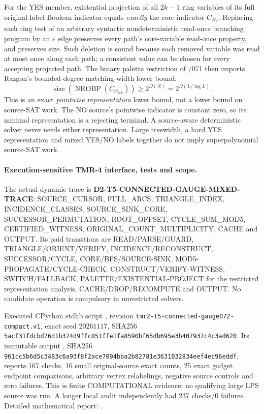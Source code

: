 \documentclass[11pt]{article}
\begin{document}
For the YES member, existential projection of all $2k-1$ ring variables of its full original-label Boolean indicator equals \emph{exactly} the core indicator $C_{H_q}$. Replacing each ring test of an arbitrary syntactic nondeterministic read-once branching program by an $\varepsilon$ edge preserves every path's core-variable read-once property, and preserves size. Such deletion is sound because each removed variable was read at most once along each path; a consistent value can be chosen for every accepting projected path. The binary palette restriction of /071 then imports Razgon's bounded-degree matching-width lower bound:
\[
 \operatorname{size}(\operatorname{NROBP}(C_{G_{5N}}))
 \ge 2^{\Omega(N)}=2^{\Omega(L/\log L)}.
\]
This is an exact \emph{pointwise representation} lower bound, not a lower bound on source-SAT work. The NO source's pointwise indicator is constant zero, so its minimal representation is a rejecting terminal. A source-aware deterministic solver never needs either representation. Large treewidth, a hard YES representation and mixed YES/NO labels together do not imply superpolynomial source-SAT work.

\paragraph{Execution-sensitive TMR-4 interface, tests and scope.}
The actual dynamic trace is \textbf{D2-T5-CONNECTED-GAUGE-MIXED-TRACE}: SOURCE\_CURSOR, FULL\_ARCS, TRIANGLE\_INDEX, INCIDENCE\_CLASSES, SOURCE\_SINK\_CORE, SUCCESSOR\_PERMUTATION, ROOT\_OFFSET, CYCLE\_SUM\_MOD5, CERTIFIED\_WITNESS, ORIGINAL\_COUNT\_MULTIPLICITY, CACHE and OUTPUT. Its paid transitions are READ/PARSE/GUARD, TRIANGLE/ORIENT/VERIFY, INCIDENCE/RECONSTRUCT, SUCCESSOR/CYCLE, CORE/BFS/SOURCE-SINK, MOD5-PROPAGATE/CYCLE-CHECK, CONSTRUCT/VERIFY-WITNESS, SWITCH/FALLBACK, PALETTE/EXISTENTIAL-PROJECT for the restricted representation analysis, CACHE/DROP/RECOMPUTE and OUTPUT. No candidate operation is compulsory in unrestricted solvers.

Executed CPython stdlib script , revision \texttt{tmr2-t5-connected-gauge072-compact.v1}, exact seed $20261117$, SHA256 \texttt{5acf31fdcbd26d1b374d9ffc851ffe1fa8590bf65db695e3b407937c4c3ad620}. Its immutable output , SHA256 \texttt{961cc5b6d5c3483c6a93f8f2ace7094bba2b82781e3631032834eef4ec96eddf}, reports 167 checks, 16 small original-source exact counts, 25 exact gadget endpoint comparisons, arbitrary vertex relabelings, negative source controls and zero failures. This is finite COMPUTATIONAL evidence; no qualifying large LPS source was run. A longer local audit independently had 237 checks/0 failures. Detailed mathematical report: .
\end{document}
